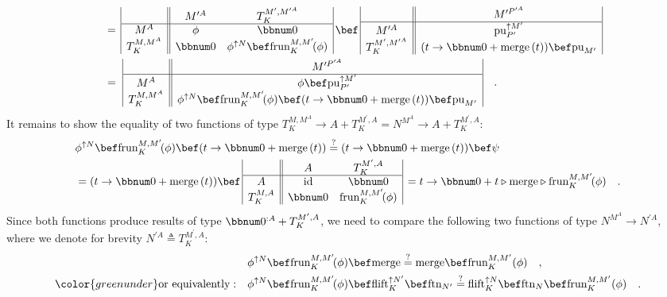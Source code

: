 \begin{align*}
 & \quad=\,\begin{array}{|c||cc|}
 & M^{\prime A} & T_{K}^{M^{\prime},M^{\prime A}}\\
\hline M^{A} & \phi & \bbnum 0\\
T_{K}^{M,M^{A}} & \bbnum 0 & \phi^{\uparrow N}\bef\text{frun}_{K}^{M,M^{\prime}}\!(\phi)
\end{array}\,\bef\,\begin{array}{|c||c|}
 & M^{\prime P^{\prime A}}\\
\hline M^{\prime A} & \text{pu}_{P^{\prime}}^{\uparrow M^{\prime}}\\
T_{K}^{M^{\prime},M^{\prime A}} & (t\rightarrow\bbnum 0+\text{merge}\,(t))\bef\text{pu}_{M^{\prime}}
\end{array}\\
 & \quad=\,\,\begin{array}{|c||c|}
 & M^{\prime P^{\prime A}}\\
\hline M^{A} & \phi\bef\text{pu}_{P^{\prime}}^{\uparrow M^{\prime}}\\
T_{K}^{M,M^{A}} & \phi^{\uparrow N}\bef\text{frun}_{K}^{M,M^{\prime}}\!(\phi)\bef(t\rightarrow\bbnum 0+\text{merge}\,(t))\bef\text{pu}_{M^{\prime}}
\end{array}\quad.
\end{align*}
It remains to show the equality of two functions of type $T_{K}^{M,M^{A}}\rightarrow A+T_{K}^{M^{\prime},A}=N^{M^{A}}\rightarrow A+T_{K}^{M^{\prime},A}$:
\begin{align*}
 & \phi^{\uparrow N}\bef\text{frun}_{K}^{M,M^{\prime}}\!(\phi)\bef(t\rightarrow\bbnum 0+\text{merge}\,(t))\overset{?}{=}(t\rightarrow\bbnum 0+\text{merge}\,(t))\bef\psi\\
 & =(t\rightarrow\bbnum 0+\text{merge}\,(t))\bef\,\begin{array}{|c||cc|}
 & A & T_{K}^{M^{\prime},A}\\
\hline A & \text{id} & \bbnum 0\\
T_{K}^{M,A} & \bbnum 0 & \text{frun}_{K}^{M,M^{\prime}}\!(\phi)
\end{array}\,=t\rightarrow\bbnum 0+t\triangleright\text{merge}\triangleright\text{frun}_{K}^{M,M^{\prime}}\!(\phi)\quad.
\end{align*}
Since both functions produce results of type $\bbnum 0^{:A}+T_{K}^{M^{\prime},A}$,
we need to compare the following two functions of type $N^{M^{A}}\rightarrow N^{\prime A}$,
where we denote for brevity $N^{\prime A}\triangleq T_{K}^{M^{\prime},A}$:
\begin{align}
 & \phi^{\uparrow N}\bef\text{frun}_{K}^{M,M^{\prime}}\!(\phi)\bef\text{merge}\overset{?}{=}\text{merge}\bef\text{frun}_{K}^{M,M^{\prime}}(\phi)\quad,\nonumber \\
{\color{greenunder}\text{or equivalently}:}\quad & \phi^{\uparrow N}\bef\text{frun}_{K}^{M,M^{\prime}}\!(\phi)\bef\text{flift}_{K}^{\uparrow N^{\prime}}\bef\text{ftn}_{N^{\prime}}\overset{?}{=}\text{flift}_{K}^{\uparrow N}\bef\text{ftn}_{N}\bef\text{frun}_{K}^{M,M^{\prime}}(\phi)\quad.\label{eq:free-pointed-sw-monadic-naturality-derivation1}
\end{align}
